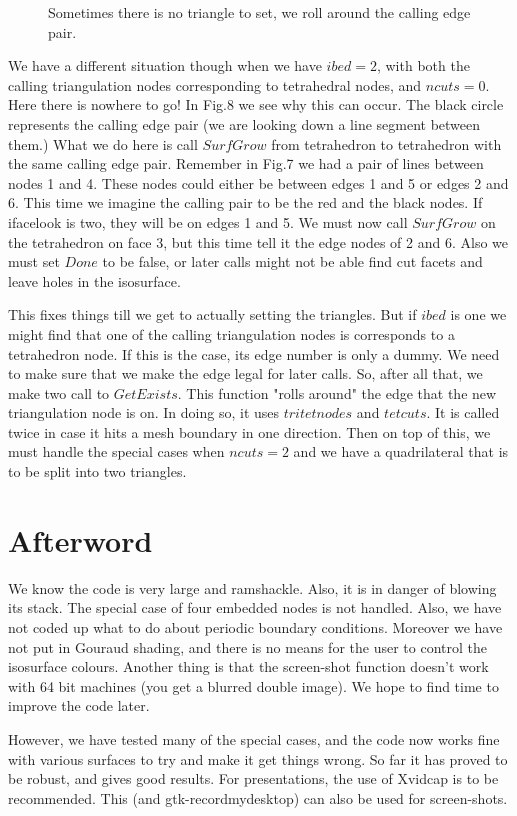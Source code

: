 \documentclass[12pt]{article}
\begin{document}
\begin{figure}
\vspace*{14cm}
\caption{Sometimes there is no triangle to set, we roll around
the calling edge pair.}
\end{figure}


We have a different situation though when we have $ibed=2$, with both
the calling triangulation nodes corresponding to tetrahedral nodes, and
$ncuts=0$. Here there is nowhere to go! In Fig.8 we see why this can occur.
 The black circle represents the calling edge pair (we are looking down a
line segment between them.) What we do here is call $SurfGrow$ from tetrahedron
to tetrahedron with the same calling edge pair. Remember in Fig.7 we had
a pair of lines between nodes 1 and 4. These nodes could either be between
 edges 1 and 5 or edges 2 and 6. This time we imagine the calling
pair to be the red and the black nodes. If ifacelook is two, they
will be on edges 1 and 5. We must now call $SurfGrow$ on the tetrahedron
on face 3, but this time tell it the edge nodes of 2 and 6. Also
we must set $Done$ to be false, or later calls might not be able
 find cut facets and leave holes in the isosurface.

This fixes things till we get to actually setting the triangles. But
if $ibed$ is one we might find that one of the calling triangulation
nodes is corresponds to a tetrahedron node. If this is the case, its
edge number is only a dummy. We need to make sure that we make the
edge legal for later calls. So, after all that, we make two call 
to $GetExists$. This function "rolls around" the edge  that the new
 triangulation node is on. In doing so, it uses $tritetnodes$ and $tetcuts$.
It is called twice in case it hits a mesh boundary in one direction.
Then on top of this, we must handle the special cases when 
$ncuts=2$ and we have a quadrilateral that is to be split into two
triangles.

\section{Afterword}

We know the code is very large and ramshackle. Also, it is 
in danger of blowing its stack. The special case of four embedded 
nodes is not handled. Also, we have not coded up what to do
about periodic boundary conditions. Moreover we have not
put in Gouraud shading, and there is no means for the user to
control the isosurface colours. Another thing is that the screen-shot
function doesn't work with 64 bit machines (you get a blurred
 double image). We hope to find time to improve the code later.

However, we have tested many of the special cases, and the code
now works fine with various surfaces to try and make it get 
things wrong. So far it has proved to be robust, and gives
good results. For presentations, the use of Xvidcap is to be recommended.
This (and gtk-recordmydesktop) can also be used for screen-shots.
\end{document}

